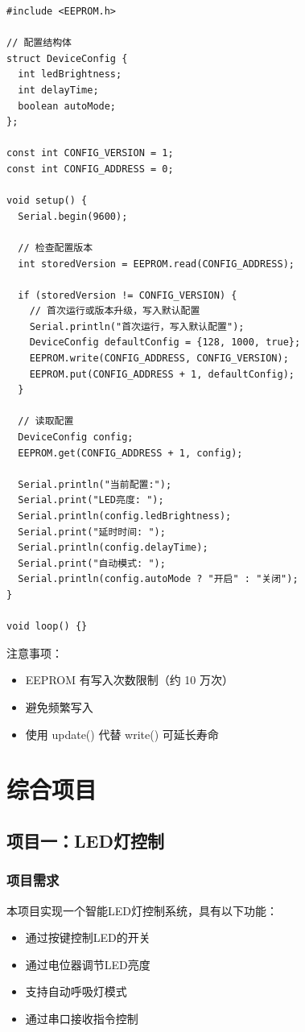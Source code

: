 \documentclass[12pt,UTF8]{ctexbook}
\begin{document}
\begin{lstlisting}
#include <EEPROM.h>

// 配置结构体
struct DeviceConfig {
  int ledBrightness;
  int delayTime;
  boolean autoMode;
};

const int CONFIG_VERSION = 1;
const int CONFIG_ADDRESS = 0;

void setup() {
  Serial.begin(9600);
  
  // 检查配置版本
  int storedVersion = EEPROM.read(CONFIG_ADDRESS);
  
  if (storedVersion != CONFIG_VERSION) {
    // 首次运行或版本升级，写入默认配置
    Serial.println("首次运行，写入默认配置");
    DeviceConfig defaultConfig = {128, 1000, true};
    EEPROM.write(CONFIG_ADDRESS, CONFIG_VERSION);
    EEPROM.put(CONFIG_ADDRESS + 1, defaultConfig);
  }
  
  // 读取配置
  DeviceConfig config;
  EEPROM.get(CONFIG_ADDRESS + 1, config);
  
  Serial.println("当前配置:");
  Serial.print("LED亮度: ");
  Serial.println(config.ledBrightness);
  Serial.print("延时时间: ");
  Serial.println(config.delayTime);
  Serial.print("自动模式: ");
  Serial.println(config.autoMode ? "开启" : "关闭");
}

void loop() {}
\end{lstlisting}

注意事项：
\begin{itemize}
    \item EEPROM 有写入次数限制（约 10 万次）
    \item 避免频繁写入
    \item 使用 update() 代替 write() 可延长寿命
\end{itemize}

\part{综合项目}

\chapter{项目一：LED灯控制}

\section{项目需求}

本项目实现一个智能LED灯控制系统，具有以下功能：
\begin{itemize}
    \item 通过按键控制LED的开关
    \item 通过电位器调节LED亮度
    \item 支持自动呼吸灯模式
    \item 通过串口接收指令控制
\end{itemize}
\end{document}
